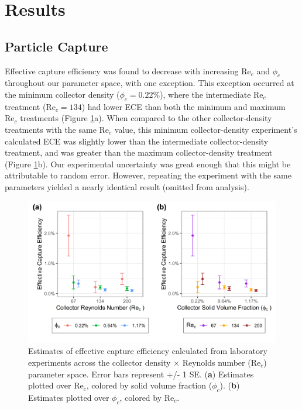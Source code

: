 \documentclass[geosciences,article,submit,moreauthors,pdftex]{Definitions/mdpi}
\newcommand\Rey{\mathrm{Re}}
\begin{document}
\section{Results}

\subsection{Particle Capture}

Effective capture efficiency was found to decrease with increasing $\Rey_c$ and $\phi_c$ throughout our parameter space, with one exception. This exception occurred at the minimum collector density ($\phi_c = 0.22\%$), where the intermediate $\Rey_c$ treatment ($\Rey_c = 134$) had lower ECE than both the minimum and maximum $\Rey_c$ treatments (Figure \ref{fig:ece}a). When compared to the other collector-density treatments with the same $\Rey_c$ value, this minimum collector-density experiment's calculated ECE was slightly lower than the intermediate collector-density treatment, and was greater than the maximum collector-density treatment (Figure \ref{fig:ece}b). Our experimental uncertainty was great enough that this might be attributable to random error. However, repeating the experiment with the same parameters yielded a nearly identical result (omitted from analysis).

\begin{figure}[H]
\centering
\includegraphics[width=5in]{../pics/ece_plot.png}
\caption{Estimates of effective capture efficiency calculated from laboratory experiments across the collector density $\times$ Reynolds number ($\Rey_c$) parameter space. Error bars represent +/- 1 SE. (\textbf{a}) Estimates plotted over $\Rey_c$, colored by solid volume fraction ($\phi_c$). (\textbf{b}) Estimates plotted over $\phi_c$, colored by $\Rey_c$.}
\label{fig:ece}
\end{figure}   
\end{document}
